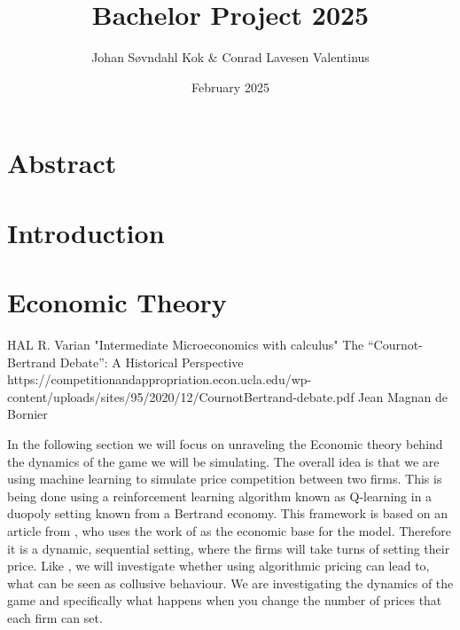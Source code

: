 \documentclass{article}
\title{Bachelor Project 2025}
\author{Johan Søvndahl Kok & Conrad Lavesen Valentinus}
\date{February 2025}
\begin{document}
\maketitle
{}
\setcounter{page}{1} 

\newpage
\section*{Abstract}



\newpage
\tableofcontents
\newpage

\setcounter{page}{1} 

\section{Introduction}

\section{Economic Theory}
HAL R. Varian "Intermediate Microeconomics with calculus"
\newline 
The “Cournot-Bertrand Debate”:
A Historical Perspective 
https://competitionandappropriation.econ.ucla.edu/wp-content/uploads/sites/95/2020/12/CournotBertrand-debate.pdf
Jean Magnan de Bornier 
\newline

In the following section we will focus on unraveling the Economic theory behind the dynamics of the game we will be simulating. 
The overall idea is that we are using machine learning to simulate price competition between two firms. This is being done using a reinforcement learning algorithm known as Q-learning in a duopoly setting known from a Bertrand economy. This framework is based on an article from \cite{Klein2021}, who uses the work of \cite{MaskinTirole} as the economic base for the model. Therefore it is a dynamic, sequential setting, where the firms will take turns of setting their price.
Like \cite{Klein2021}, we will investigate whether using algorithmic pricing can lead to, what can be seen as collusive behaviour.
\newline
We are investigating the dynamics of the game and specifically what happens when you change the number of prices that each firm can set.
\newline
\end{document}
